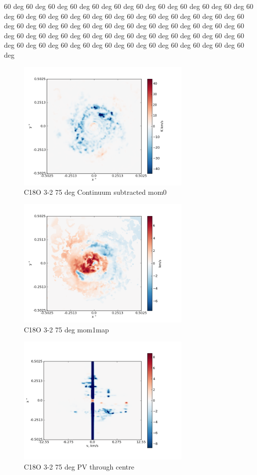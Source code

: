 \documentclass[useAMS,usenatbib]{mn2e}
\begin{document}
60 deg 60 deg 60 deg 60 deg 60 deg 60 deg 60 deg 60 deg 60 deg 60 deg 60 deg 60 deg 60 deg 60 deg 60 deg 60 deg 60 deg 60 deg 60 deg 60 deg 60 deg 60 deg 60 deg 60 deg 60 deg 60 deg 60 deg 60 deg 60 deg 60 deg 60 deg 60 deg 60 deg 60 deg 60 deg 60 deg 60 deg 60 deg 60 deg 60 deg 60 deg 60 deg 60 deg 60 deg 60 deg 60 deg 60 deg 60 deg 60 deg 60 deg 60 deg 60 deg 60 deg 60 deg 60 deg 60 deg 

\begin{figure}
 \includegraphics[width=84mm]{Figures/sim/imageC18O_3-2_75deg_contSub.png}

 \caption{C18O 3-2 75 deg Continuum subtracted mom0}
\end{figure}

\begin{figure}
 \includegraphics[width=84mm]{Figures/sim/imageC18O_3-2_75deg_mom1.png}

 \caption{C18O 3-2 75 deg mom1map}
\end{figure}

\begin{figure}
 \includegraphics[width=84mm]{Figures/sim/imageC18O_3-2_75deg_PV_centre.png}

 \caption{C18O 3-2 75 deg PV through centre}
\end{figure}
\end{document}
